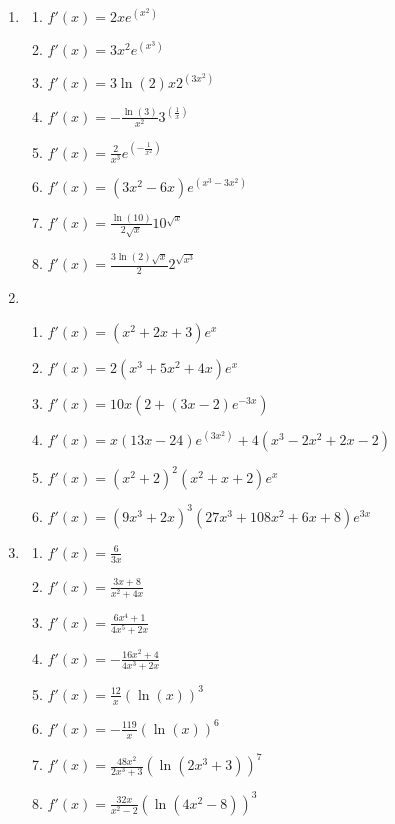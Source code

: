 \documentclass[a4paper,12pt]{article}
\begin{document}
\begin{enumerate}
\item
    \begin{multicols}{2}
    \begin{enumerate}
    \item \spacer$f'(x) = 2xe^{(x^2)}$
    \item \spacer$f'(x) = 3x^2e^{(x^3)}$
    \item \spacer$f'(x) = 3\ln(2)x2^{(3x^2)}$
    \item \spacer$f'(x) = -\frac{\ln(3)}{x^2}3^{(\frac{1}{x})}$
    \item \spacer$f'(x) = \frac{2}{x^3}e^{(-\frac{1}{x^2})}$
    \item \spacer$f'(x) = (3x^2 - 6x)e^{(x^3 - 3x^2)}$
    \item \spacer$f'(x) = \frac{\ln(10)}{2\sqrt{x}}10^{\sqrt{x}}$
    \item \spacer$f'(x) = \frac{3\ln(2)\sqrt{x}}{2}2^{\sqrt{x^3}}$
    \end{enumerate}
    \end{multicols}

\item
    \begin{enumerate}
    \item \sspacer$f'(x) = (x^2 + 2x + 3)e^x$
    \item \sspacer$f'(x) = 2(x^3 + 5x^2 + 4x)e^x$
    \item \sspacer$f'(x) = 10x(2 + (3x - 2)e^{-3x})$
    \item \sspacer$f'(x) = x(13x - 24)e^{(3x^2)} + 4(x^3 - 2x^2 + 2x - 2)$
    \item \sspacer$f'(x) = (x^2+2)^2(x^2 + x + 2)e^x$
    \item \sspacer$f'(x) = (9x^3 + 2x)^3(27x^3 + 108x^2 + 6x + 8)e^{3x}$
    \end{enumerate}

\item
    \begin{multicols}{2}
    \begin{enumerate}
    \item \spacer$f'(x) = \frac{6}{3x}$
    \item \spacer$f'(x) = \frac{3x + 8}{x^2 + 4x}$
    \item \spacer$f'(x) = \frac{6x^4 + 1}{4x^5 + 2x}$
    \item \spacer$f'(x) = -\frac{16x^2 + 4}{4x^3 + 2x}$
    \item \spacer$f'(x) =\frac{12}{x}(\ln(x))^3$
    \item \spacer$f'(x) = -\frac{119}{x}(\ln(x))^6$
    \item \spacer$f'(x) = \frac{48x^2}{2x^3 + 3}(\ln(2x^3 + 3))^7$
    \item \spacer$f'(x) = \frac{32x}{x^2-2}(\ln(4x^2 - 8))^3$
    \end{enumerate}
    \end{multicols}


\end{enumerate}
\end{document}
